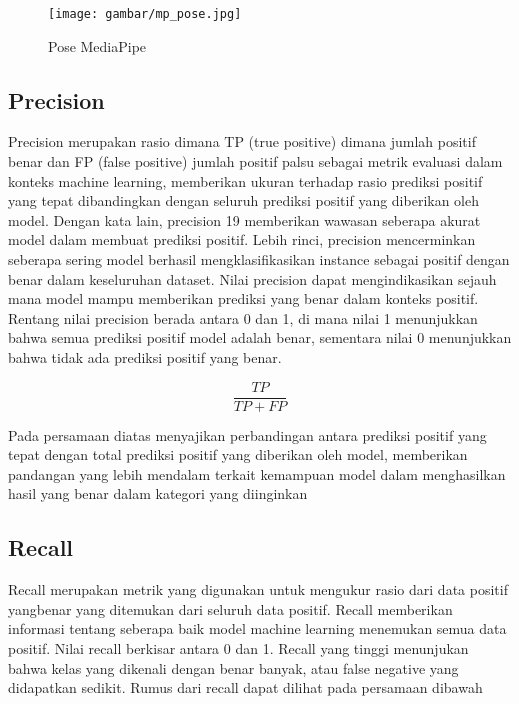 \begin{figure}[H]
  \centering

  \texttt{[image: gambar/mp\_pose.jpg]}

  \caption{Pose MediaPipe}
  \label{fig:Pose MediaPipe}
\end{figure}

\subsection*{Precision}
Precision merupakan rasio dimana TP (true positive) dimana jumlah positif benar dan FP (false positive) jumlah positif palsu sebagai metrik evaluasi dalam konteks machine learning, memberikan ukuran terhadap rasio prediksi positif yang tepat dibandingkan dengan seluruh prediksi positif yang diberikan oleh model. Dengan kata lain, precision 19 memberikan wawasan seberapa akurat model dalam membuat prediksi positif. Lebih rinci, precision mencerminkan seberapa sering model berhasil mengklasifikasikan instance sebagai positif dengan benar dalam keseluruhan dataset. Nilai precision dapat mengindikasikan sejauh mana model mampu memberikan prediksi yang benar dalam konteks positif. Rentang nilai precision berada antara 0 dan 1, di mana nilai 1 menunjukkan bahwa semua prediksi positif model adalah benar, sementara nilai 0 menunjukkan bahwa tidak ada prediksi positif yang benar.

\begin{equation}
    \frac{TP}{TP+FP}
\end{equation}

Pada persamaan diatas menyajikan perbandingan antara prediksi positif yang tepat dengan total prediksi positif yang diberikan oleh model, memberikan pandangan yang lebih mendalam terkait kemampuan model dalam menghasilkan hasil yang benar dalam kategori yang diinginkan

\subsection*{Recall}
Recall merupakan metrik yang digunakan untuk mengukur rasio dari data positif yangbenar yang ditemukan dari seluruh data positif. Recall memberikan informasi tentang seberapa baik model machine learning menemukan semua data positif. Nilai recall berkisar antara 0 dan 1. Recall yang tinggi menunjukan bahwa kelas yang dikenali dengan benar banyak, atau false negative yang didapatkan sedikit. Rumus dari recall dapat dilihat pada persamaan dibawah

